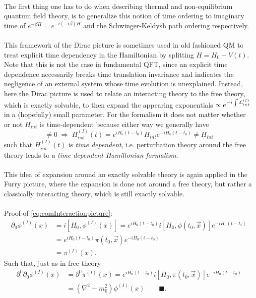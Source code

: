 \\
The first thing one has to do when describing thermal and non-equilibrium quantum field theory, is to generalize this notion of time ordering to imaginary time of $e^{-\beta H} = e^{-i (-i\beta) H}$ and the Schwinger-Keldysh path ordering respectively.\\
\\
This framework of the Dirac picture is sometimes used in old fashioned QM to treat explicit time dependency in the Hamiltonian by splitting $H=H_0 + V(t)$. Note that this is not the case in fundamental QFT, since an explicit time dependence necessarily breaks time translation invariance and indicates the negligence of an external system whose time evolution is unexplained. Instead, here the Dirac picture is used to relate an interacting theory to the free theory, which is exactly solvable, to then expand the appearing exponentials $\propto e^{-i \int \mathcal{L}^{(I)}_{int}}$ in a (hopefully) small parameter. For the formalism it does not matter whether or not $H_{int}$ is time-dependent because either way we generally have
\begin{equation}
	[H_0,H] \neq 0 \; \Rightarrow \; H^{(I)}_{int} (t) = e^{i H_0 (t-t_0)} H_{int} e^{-i H_0(t-t_0)} \neq H_{int}
\end{equation}
such that $H^{(I)}_{int}(t)$ is \emph{time dependent}, i.e. perturbation theory around the free theory leads to a \emph{time dependent Hamiltonian formalism}.\\
\\
This idea of expansion around an exactly solvable theory is again applied in the Furry picture, where the expansion is done not around a free theory, but rather a classically interacting theory, which is still exactly solvable.\\
\\
Proof of \ref{eq:eomInteractionpicture}:
\begin{align*}
	\partial_0 \phi^{(I)} (x) &= i \left[H_0,\phi^{(I)} (x)\right] = e^{i H_0(t-t_0)} i [H_0,\phi(t_0,\vec{x})] e^{-i H_0(t-t_0)} \\
	&= e^{i H_0(t-t_0)} \pi(t_0,\vec{x}) e^{-i H_0 (t-t_0)} \\
	&= \pi^{(I)} (x).
\end{align*}
Such that, just as in free theory
\begin{align*}
	\partial^0 \partial_0 \phi^{(I)} (x) &= \partial^0 \pi^{(I)} (x) = e^{i H_0(t-t_0)} i [H_0,\pi(t_0,\vec{x})] e^{-iH_0(t-t_0)} \\
	&= (\nabla^2-m^2_0) \phi^{(I)} (x) \qquad \blacksquare.
\end{align*}

